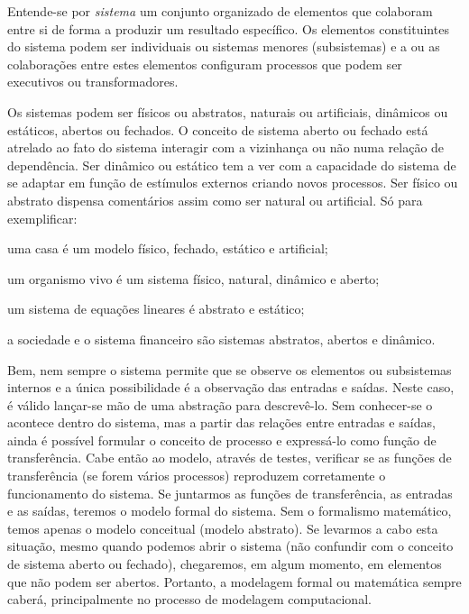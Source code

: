 \documentclass[a4paper,12pt,oneside,onecolumn]{uerj/uerj}
\begin{document}
Entende-se por \emph{sistema} um conjunto organizado de elementos que colaboram entre si de forma a produzir um resultado específico. Os elementos constituintes do sistema podem ser individuais ou sistemas menores (subsistemas) e a ou as colaborações entre estes elementos configuram processos que podem ser executivos ou transformadores.

Os sistemas podem ser físicos ou abstratos, naturais ou artificiais, dinâmicos ou estáticos, abertos ou fechados. O conceito de sistema aberto ou fechado está atrelado ao fato do sistema interagir com a vizinhança ou não numa relação de dependência. Ser dinâmico ou estático tem a ver com a capacidade do sistema de se adaptar em função de estímulos externos criando novos processos. Ser físico ou abstrato dispensa comentários assim como ser natural ou artificial. Só para exemplificar: 

\begin{lcircp}
    \item uma casa é um modelo físico, fechado, estático e artificial;
    \item um organismo vivo é um sistema físico, natural, dinâmico e aberto;
    \item um sistema de equações lineares é abstrato e estático;
    \item a sociedade e o sistema financeiro são sistemas abstratos, abertos e dinâmico.\\ 
\end{lcircp}

Bem, nem sempre o sistema permite que se observe os elementos ou subsistemas internos e a única possibilidade é a observação das entradas e saídas. Neste caso, é válido lançar-se mão de uma abstração para descrevê-lo. Sem conhecer-se o acontece dentro do sistema, mas a partir das relações entre entradas e saídas, ainda é possível formular o conceito de processo e expressá-lo como função de transferência. Cabe então ao modelo, através de testes, verificar se as funções de transferência (se forem vários processos) reproduzem corretamente o funcionamento do sistema. Se juntarmos as funções de transferência, as entradas e as saídas, teremos o modelo formal do sistema. Sem o formalismo matemático, temos apenas o modelo conceitual (modelo abstrato). Se levarmos a cabo esta situação, mesmo quando podemos abrir o sistema (não confundir com o conceito de sistema aberto ou fechado), chegaremos, em algum momento, em elementos que não podem ser abertos. Portanto, a modelagem formal ou matemática sempre caberá, principalmente no processo de modelagem computacional.
\end{document}
